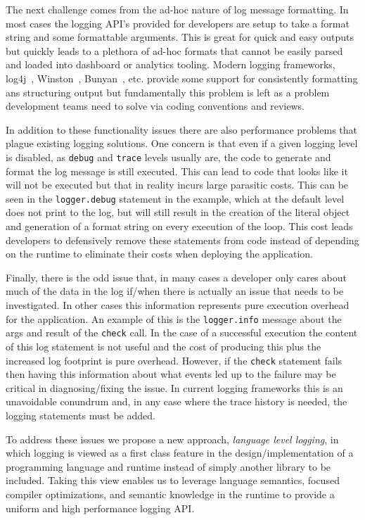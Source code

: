 \documentclass[preprint]{sig-alternate-05-2015}
\begin{document}
The next challenge comes from the ad-hoc nature of log message formatting. In
most cases the logging API's provided for developers are setup to take a format
string and some formattable arguments. This is great for quick and easy outputs
but quickly leads to a plethora of ad-hoc formats that cannot be easily parsed
and loaded into dashboard or analytics tooling. Modern logging frameworks,
log4j~\cite{log4j}, Winston~\cite{Winston}, Bunyan~\cite{Bunyan}, etc. provide
some support for consistently formatting ans structuring output but
fundamentally this problem is left as a problem development teams need to solve
via coding conventions and reviews.

In addition to these functionality issues there are also performance problems
that plague existing logging solutions. One concern is that even if a given
logging level is disabled, as \texttt{debug} and \texttt{trace} levels usually
are, the code to generate and format the log message is still executed. This can
lead to code that looks like it will not be executed but that in reality incurs
large parasitic costs. This can be seen in the \texttt{logger.debug} statement
in the example, which at the default level does not print to the log, but will
still result in the creation of the literal object and generation of a format
string on every execution of the loop. This cost leads developers to defensively
remove these statements from code instead of depending on the runtime to
eliminate their costs when deploying the application.

Finally, there is the odd issue that, in many cases a developer only cares about
much of the data in the log if/when there is actually an issue that needs to be
investigated. In other cases this information represents pure execution overhead
for the application. An example of this is the \texttt{logger.info} message
about the args and result of the \texttt{check} call. In the case of a
successful execution the content of this log statement is not useful and the
cost of producing this plus the increased log footprint is pure overhead.
However, if the \texttt{check} statement fails then having this information
about what events led up to the failure may be critical in diagnosing/fixing the
issue. In current logging frameworks this is an unavoidable conundrum and, in
any case where the trace history is needed, the logging statements must be
added.

To address these issues we propose a new approach, \emph{language level
logging}, in which logging is viewed as a first class feature in the
design/implementation of a programming language and runtime instead of simply
another library to be included. Taking this view enables us to leverage language
semantics, focused compiler optimizations, and semantic knowledge in the runtime
to provide a uniform and high performance logging API.
\end{document}
